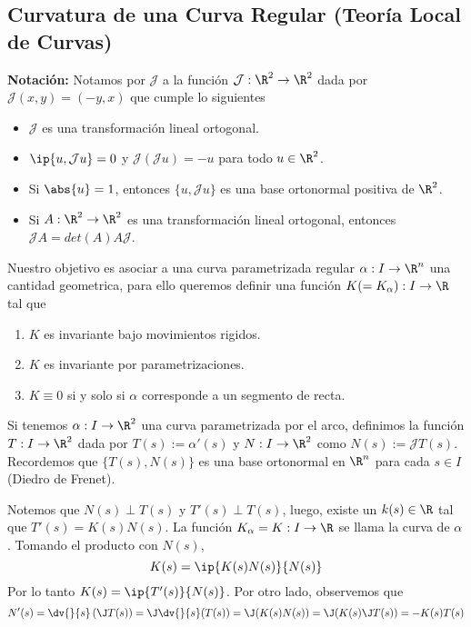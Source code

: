 \documentclass{article}
\begin{document}
\subsection{Curvatura de una Curva Regular (Teoría Local de Curvas)}

\noindent\textbf{Notación:} Notamos por $\mathcal{J}$ a la función $\mathcal{J}:\R^{2}\to\R^{2}$
dada por $\mathcal{J}(x,y)=(-y,x)$ que cumple lo siguientes

\begin{itemize}
    \item $\mathcal{J}$ es una transformación lineal ortogonal.
    \item $\ip{u,\mathcal{J}u}=0$ y $\mathcal{J}(\mathcal{J}u)=-u$ para todo $u\in\R^{2}$.
    \item Si $\abs{u}=1$, entonces $\{u,\mathcal{J}u\}$ es una base ortonormal positiva de 
    $\R^{2}$.
    \item Si $A:\R^{2}\to\R^{2}$ es una transformación lineal ortogonal, entonces 
    $\mathcal{J}A=det(A)A\mathcal{J}$.
\end{itemize}

\noindent Nuestro objetivo es asociar a una curva parametrizada regular $\alpha: I\to\R^{n}$ una 
cantidad geometrica, para ello queremos definir una función $K(=K_{\alpha}): I\to\R$ tal que
\begin{enumerate}
    \item $K$ es invariante bajo movimientos rigidos.
    \item $K$ es invariante por parametrizaciones.
    \item $K\equiv0$ si y solo si $\alpha$ corresponde a un segmento de recta.
\end{enumerate}

\noindent Si tenemos $\alpha: I\to\R^{2}$ una curva parametrizada por el arco, definimos la función 
$T: I\to\R^{2}$ dada por $T(s):=\alpha'(s)$ y $N: I\to\R^{2}$ como $N(s):=\mathcal{J}T(s)$.
Recordemos que $\{T(s),N(s)\}$ es una base ortonormal en $\R^{n}$ para cada $s\in I$ 
(Diedro de Frenet).
\vspace{4mm}

\noindent Notemos que $N(s)\perp T(s)$ y $T'(s)\perp T(s)$, luego, existe un $k(s)\in\R$ tal que 
$T'(s)=K(s)N(s)$. La función $K_{\alpha}=K: I\to\R$ se llama la curva de $\alpha$. Tomando el 
producto con $N(s)$,
\begin{equation*}
    K(s)=\ip{K(s)N(s)}{N(s)}
\end{equation*}
Por lo tanto $K(s)=\ip{T'(s)}{N(s)}$. Por otro lado, observemos que
\begin{equation*}
    N'(s)=\dv{}{s}\left(\J T(s)\right)=\J\dv{}{s}(T(s))=\J(K(s)N(s))=\J(K(s)\J T(s))=-K(s)T(s)
\end{equation*}
\end{document}
